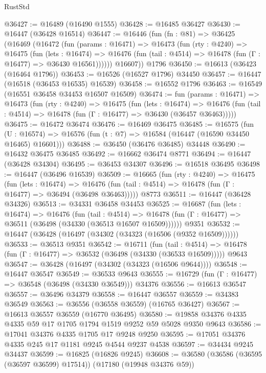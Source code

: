 \begin{lexlean}{RustStd}
\begin{coremodule}
@36427 := @16489 (@16490 @1555)
@36428 := @16485 @36427
@36430 := @16447 (@36428 @16514)
@36447 := @16446
    (fun (fn : @81) =>
    @36425
      (@16469
        (@16472
          (fun (params : @16471) =>
          @16473
            (fun (rty : @4240) =>
            @16475
              (fun (lets : @16474) =>
              @16476 (fun (tail : @4514) => @16478 (fun (Γ : @16477) => @36430 @16561))))))
        @16607))
    @1796
@36450 := @16613 (@36423 (@16464 @1796))
@36453 := @16526 (@16527 @1796) @34450
@36457 := @16447 (@16518 (@36453 @16535) @16539)
@36458 := @16552 @1796
@36463 := @16549 (@16551 @36458 @34453 @16507 @16509)
@36474 := fun (params : @16471) =>
  @16473
    (fun (rty : @4240) =>
    @16475
      (fun (lets : @16474) =>
      @16476 (fun (tail : @4514) => @16478 (fun (Γ : @16477) => @36430 (@36457 @36463)))))
@36475 := @16472 @36474
@36476 := @16469 @36475
@36485 := @16575
    (fun (U : @16574) => @16576 (fun (t : @7) => @16584 (@16447 (@16590 @34450 @16465) @16601)))
@36488 := @36450 (@36476 @36485) @34448
@36490 := @16432 @36475 @36485
@36492 := @16662 @36474 @8771
@36494 := @16447 (@36428 @34304)
@36495 := @36453 @34307
@36496 := @16518 @36495
@36498 := @16447 (@36496 @16539)
@36509 := @16665
    (fun (rty : @4240) =>
    @16475
      (fun (lets : @16474) =>
      @16476 (fun (tail : @4514) => @16478 (fun (Γ : @16477) => @36494 (@36498 @36463)))))
    @8773
@36511 := @16447 (@36428 @34326)
@36513 := @34331 @36458 @34453
@36525 := @16687
    (fun (lets : @16474) =>
    @16476
      (fun (tail : @4514) =>
      @16478 (fun (Γ : @16477) => @36511 (@36498 (@34330 (@36513 @16507 @16509))))))
    @9351
@36532 := @16447 (@36428 (@16497 (@34302 (@34323 (@16506 (@9352 @16509))))))
@36533 := @36513 @9351
@36542 := @16711
    (fun (tail : @4514) => @16478 (fun (Γ : @16477) => @36532 (@36498 (@34330 (@36533 @16509)))))
    @9643
@36547 := @36428 (@16497 (@34302 (@34323 (@16506 @9644))))
@36548 := @16447 @36547
@36549 := @36533 @9643
@36555 := @16729 (fun (Γ : @16477) => @36548 (@36498 (@34330 @36549))) @34376
@36556 := @16613 @36547
@36557 := @36496 @34379
@36558 := @16447 @36557
@36559 := @34383 @36549
@36563 := @36556 (@36558 @36559) (@16765 @36427)
@36567 := @16613 @36557 @36559 (@16770 @36495)
@36580 := @19858 @34376 @4335 @4335 @59 @17 @1705 @1794 @1519 @9252 @59 @5028 @9350 @9643
@36586 := @17041 @34376 @4335 @1705 @17 @9248 @9250
@36595 := @17051 @34376 @4335 @245 @17 @1181 @9245 @4544 @9237 @4538
@36597 := @34434 @9245 @34437
@36599 := @16825 (@16826 @9245)
@36608 := @36580 (@36586 (@36595 (@36597 @36599) @17514)) (@17180 (@19948 @34376 @59))

\end{coremodule}
\end{lexlean}
